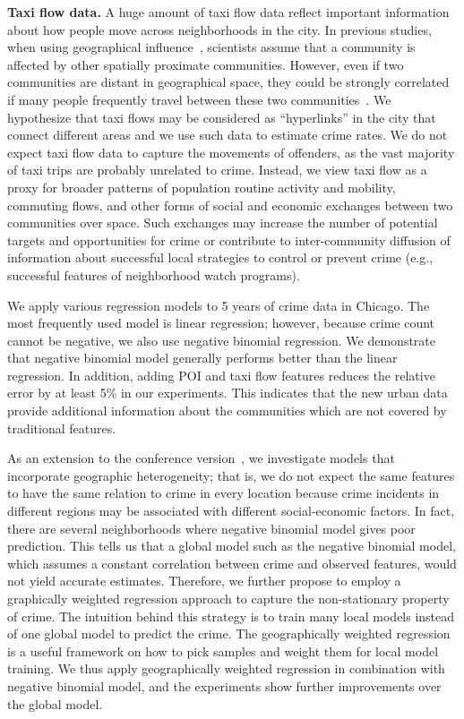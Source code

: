\textbf{Taxi flow data.} A huge amount of taxi flow data reflect important information about how people move across neighborhoods in the city. In previous studies, when using geographical influence~\cite{Ans02}, scientists assume that a community is affected by other spatially proximate communities. However, even if two communities are distant in geographical space, they could be strongly correlated if many people frequently travel between these two communities~\cite{GGM14}. We hypothesize that taxi flows may be considered as ``hyperlinks'' in the city that connect different areas and we use such data to estimate crime rates. 
We do not expect taxi flow data to capture the movements of offenders, as the vast majority of taxi trips are probably unrelated to crime. Instead, we view taxi flow as a proxy for broader patterns of population routine activity and mobility, commuting flows, and other forms of social and economic exchanges between two communities over space. Such exchanges may increase the number of potential targets and opportunities for crime \cite{CLFM79,BPBP95} or contribute to inter-community diffusion of information about successful local strategies to control  or prevent crime (e.g., successful features of neighborhood watch programs). 

We apply various regression models to 5 years of crime data in Chicago. The most frequently used model is linear regression; however, because crime count cannot be negative, we also use negative binomial regression.  We demonstrate that negative binomial model generally performs better than the linear regression. In addition, adding POI and taxi flow features reduces the relative error by at least 5\% in our experiments. This indicates that the new urban data provide additional information about the communities which are not covered by traditional features.

As an extension to the conference version~\cite{WKGL16}, we investigate models that incorporate geographic heterogeneity; that is, we do not expect the same features to have the same relation to crime in every location because crime incidents in different regions may be associated with different social-economic factors.
In fact, there are several neighborhoods where negative binomial model gives poor prediction. This tells us that a global model such as the negative binomial model, which assumes a constant correlation between crime and observed features, would not yield accurate estimates. Therefore, we further propose to employ a graphically weighted regression approach to capture the non-stationary property of crime. The intuition behind this strategy is to train many local models instead of one global model to predict the crime. The geographically weighted regression is a useful framework on how to pick samples and weight them for local model training. We thus apply geographically weighted regression in combination with negative binomial model, and the experiments show further improvements over the global model.


